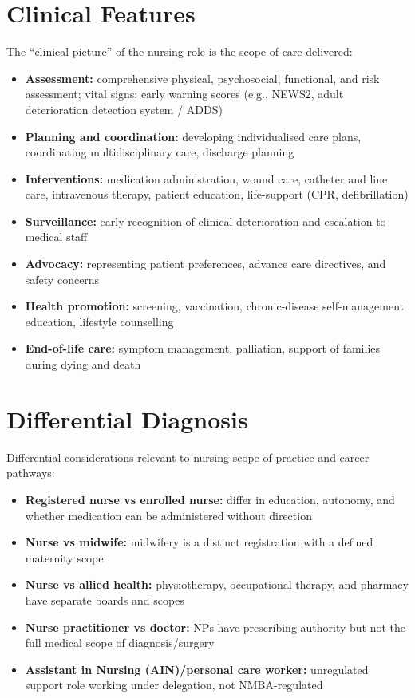 \section*{Clinical Features}
The ``clinical picture'' of the nursing role is the scope of care delivered:
\begin{itemize}
    \item \textbf{Assessment:} comprehensive physical, psychosocial, functional, and risk assessment; vital signs; early warning scores (e.g., NEWS2, adult deterioration detection system / ADDS)
    \item \textbf{Planning and coordination:} developing individualised care plans, coordinating multidisciplinary care, discharge planning
    \item \textbf{Interventions:} medication administration, wound care, catheter and line care, intravenous therapy, patient education, life-support (CPR, defibrillation)
    \item \textbf{Surveillance:} early recognition of clinical deterioration and escalation to medical staff
    \item \textbf{Advocacy:} representing patient preferences, advance care directives, and safety concerns
    \item \textbf{Health promotion:} screening, vaccination, chronic-disease self-management education, lifestyle counselling
    \item \textbf{End-of-life care:} symptom management, palliation, support of families during dying and death
\end{itemize}

\section*{Differential Diagnosis}
Differential considerations relevant to nursing scope-of-practice and career pathways:
\begin{itemize}
    \item \textbf{Registered nurse vs enrolled nurse:} differ in education, autonomy, and whether medication can be administered without direction
    \item \textbf{Nurse vs midwife:} midwifery is a distinct registration with a defined maternity scope
    \item \textbf{Nurse vs allied health:} physiotherapy, occupational therapy, and pharmacy have separate boards and scopes
    \item \textbf{Nurse practitioner vs doctor:} NPs have prescribing authority but not the full medical scope of diagnosis/surgery
    \item \textbf{Assistant in Nursing (AIN)/personal care worker:} unregulated support role working under delegation, not NMBA-regulated
\end{itemize}

